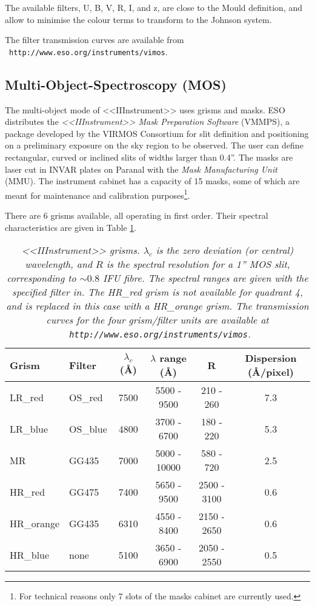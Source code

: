 The available filters, U, B, V, R, I, and z, are close to the Mould 
definition, and allow 
to minimise the colour terms to transform to the Johnson system.

The filter transmission curves are available from  \
{\tt http://www.eso.org/instruments/vimos}.

\subsection{Multi-Object-Spectroscopy (MOS)}
\label{INSTR:MOS}

The multi-object mode of <<IIInstrument>> uses grisms and masks. ESO distributes
the {\it <<IIInstrument>> Mask Preparation Software} (VMMPS), a package
developed by the VIRMOS Consortium for slit definition and 
positioning on a preliminary exposure on the sky region to be observed. 
The user can define rectangular, curved or inclined slits of widths
larger than 0.4''.
The masks are laser cut in INVAR plates on Paranal with the 
{\it Mask Manufacturing Unit} (MMU). 
The instrument cabinet has a capacity of 15 masks, some of which 
are meant for maintenance and calibration purposes\footnote{For 
technical reasons only 7 slots of the masks cabinet
are currently used.}. 

There are 6 grisms available, all operating in first order.
Their spectral characteristics are given in Table \ref{TGRISMS}.

\begin{table}[h]
  \begin{center}
    \begin{tabular}{|l|l|c|c|c|c|}
    \hline
      {\bf Grism} & {\bf Filter} & {\bf $\lambda_c$} (\AA) & {\bf $\lambda$ range} (\AA) & {\bf R} & {\bf Dispersion} (\AA/pixel) \\
    \hline

LR\_red    & OS\_red  & 7500 & 5500 - 9500 & 210 - 260 & 7.3 \\
LR\_blue   & OS\_blue & 4800 & 3700 - 6700 & 180 - 220 & 5.3 \\
MR         & GG435    & 7000 & 5000 - 10000 & 580 - 720 & 2.5 \\
HR\_red    & GG475    & 7400 & 5650 - 9500 & 2500 - 3100 & 0.6 \\
HR\_orange & GG435    & 6310 & 4550 - 8400 & 2150 - 2650 & 0.6 \\
HR\_blue   & none     & 5100 & 3650 - 6900 & 2050 - 2550 & 0.5 \\

    \hline
    \end{tabular}
    \caption{\it <<IIInstrument>> grisms. 
$\lambda_c$ is the zero deviation
(or central) wavelength, and $R$ is the spectral resolution for a
1'' MOS slit, corresponding to $\sim 0.8$ IFU fibre. The spectral ranges
are given with the specified filter in.
The HR\_red grism is not available for quadrant 4, and is replaced
in this case with a HR\_orange grism. The transmission curves for
the four grism/filter units are available at \
{\tt http://www.eso.org/instruments/vimos}.}
    \label{TGRISMS}
  \end{center}
\end{table}


